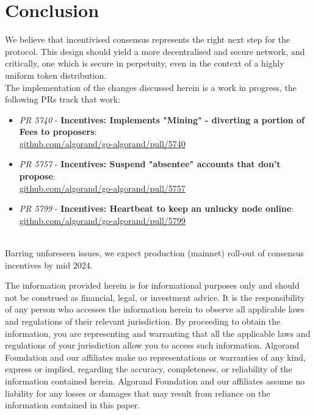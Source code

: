 \documentclass[11pt,a4paper]{article}
\begin{document}
\pagebreak

\section{Conclusion}
We believe that incentivised consensus represents the right next step for the protocol. This design should yield a more 
decentralised and secure network, and critically, one which is secure in perpetuity, even in the context of a highly 
uniform token distribution. \\ 

The implementation of the changes discussed herein is a work in progress, the following PRs track that work:


\begin{itemize}
    \item \emph{PR 5740} - \textbf{Incentives: Implements "Mining" - diverting a portion of Fees to proposers}:\\
          \href{https://github.com/algorand/go-algorand/pull/5740}{github.com/algorand/go-algorand/pull/5740} \\
    \item \emph{PR 5757} - \textbf{Incentives: Suspend "absentee" accounts that don't propose}:\\
          \href{https://github.com/algorand/go-algorand/pull/5757}{github.com/algorand/go-algorand/pull/5757} \\
    \item \emph{PR 5799} - \textbf{Incentives: Heartbeat to keep an unlucky node online}:\\
          \href{https://github.com/algorand/go-algorand/pull/5799}{github.com/algorand/go-algorand/pull/5799}
\end{itemize} \mbox{} \\ 


Barring unforeseen issues, we expect production (mainnet) roll-out of consensus incentives by mid 2024.

\pagebreak

\printglossaries

\pagebreak

The information provided herein is for informational purposes only and should not be
construed as financial, legal, or investment advice. It is the responsibility of any person
who accesses the information herein to observe all applicable laws and regulations of
their relevant jurisdiction. By proceeding to obtain the information, you are representing
and warranting that all the applicable laws and regulations of your jurisdiction allow
you to access such information. Algorand Foundation and our affiliates make no
representations or warranties of any kind, express or implied, regarding the accuracy,
completeness, or reliability of the information contained herein. Algorand Foundation
and our affiliates assume no liability for any losses or damages that may result from
reliance on the information contained in this paper.
\end{document}

